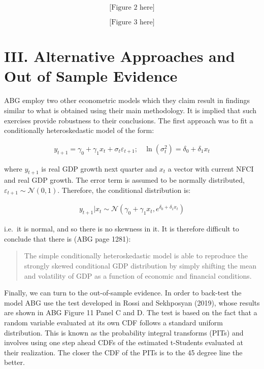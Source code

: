 \documentclass[11pt,]{article}
\begin{document}
\[
\text{[Figure 2 here]}
\]

\[
\text{[Figure 3 here]}
\]

\hypertarget{iii.-alternative-approaches-and-out-of-sample-evidence}{%
\section{III. Alternative Approaches and Out of Sample
Evidence}\label{iii.-alternative-approaches-and-out-of-sample-evidence}}

ABG employ two other econometric models which they claim result in
findings similar to what is obtained using their main methodology. It is
implied that such exercises provide robustness to their conclusions. The
first approach was to fit a conditionally heteroskedastic model of the
form:

\begin{align}
y_{t+1} = \gamma_0 + \gamma_1 x_t + \sigma_t\varepsilon_{t+1}; \ \ \ \ \ln(\sigma^2_t) = \delta_0 + \delta_1 x_t
\end{align}

where \(y_{t+1}\) is real GDP growth next quarter and \(x_t\) a vector
with current NFCI and real GDP growth. The error term is assumed to be
normally distributed, \(\varepsilon_{t+1} \sim \mathcal{N}(0,1)\).
Therefore, the conditional distribution is:

\begin{align}
y_{t+1}|x_t \sim \mathcal{N}(\gamma_0 + \gamma_1 x_t, e^{\delta_0 + \delta_1 x_t})
\end{align}

i.e.~it is normal, and so there is no skewness in it. It is therefore
difficult to conclude that there is (ABG page 1281):

\begin{quote}
The simple conditionally heteroskedastic model is able to reproduce the
strongly skewed conditional GDP distribution by simply shifting the mean
and volatility of GDP as a function of economic and financial
conditions.
\end{quote}

Finally, we can turn to the out-of-sample evidence. In order to
back-test the model ABG use the test developed in Rossi and Sekhposyan
(2019), whose results are shown in ABG Figure 11 Panel C and D. The test
is based on the fact that a random variable evaluated at its own CDF
follows a standard uniform distribution. This is known as the
probability integral transforms (PITs) and involves using one step ahead
CDFs of the estimated t-Students evaluated at their realization. The
closer the CDF of the PITs is to the 45 degree line the better.
\end{document}
